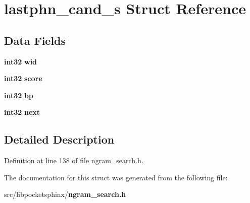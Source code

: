 \section{lastphn\-\_\-cand\-\_\-s \-Struct \-Reference}
\label{structlastphn__cand__s}
\subsection*{\-Data \-Fields}
\begin{DoxyCompactItemize}
\item 
{\bf int32} {\bfseries wid}\label{structlastphn__cand__s_af8f9fa3e4b6b7e2295d7a437b6f754c3}

\item 
{\bf int32} {\bfseries score}\label{structlastphn__cand__s_af862094c7b2476c6a66dbc120b19775b}

\item 
{\bf int32} {\bfseries bp}\label{structlastphn__cand__s_aa1aeb014f9023a75c81813376115fbcc}

\item 
{\bf int32} {\bfseries next}\label{structlastphn__cand__s_a06dade75d757f45e5d43b4869d85bac9}

\end{DoxyCompactItemize}


\subsection{\-Detailed \-Description}


\-Definition at line 138 of file ngram\-\_\-search.\-h.



\-The documentation for this struct was generated from the following file\-:\begin{DoxyCompactItemize}
\item 
src/libpocketsphinx/{\bf ngram\-\_\-search.\-h}\end{DoxyCompactItemize}
